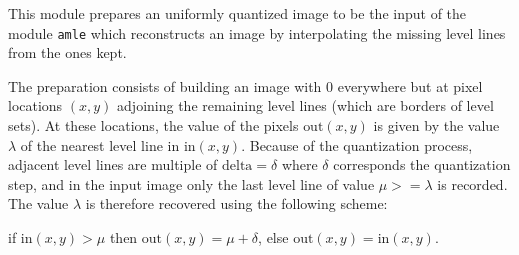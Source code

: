 This module prepares an uniformly quantized image to be the input of the 
module \verb+amle+ which reconstructs
an image by interpolating the missing level lines from the ones kept.

The preparation consists of building an image with $0$ everywhere but
at pixel locations $(x,y)$ adjoining the remaining level lines (which are borders of level sets).
At these locations, the value of the pixels $\mbox{out}(x,y)$ is given by the 
value $\lambda$ of the nearest level line in $\mbox{in}(x,y)$.
Because of the quantization process, adjacent level lines are multiple
of $\mbox{delta}=\delta$ where $\delta$ corresponds the quantization step, 
and in the input image only the last level line of value $\mu >= \lambda$ is
recorded. The value $\lambda$ is therefore recovered using the following 
scheme:

if $\mbox{in}(x,y) > \mu$ then $\mbox{out}(x,y) = \mu + \delta$,
else  $\mbox{out}(x,y) = \mbox{in}(x,y)$.
